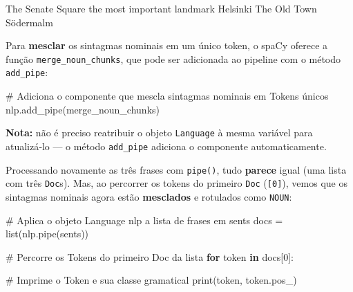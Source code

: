 \documentclass[
  brazilian,
  11pt,
]{article}
\newenvironment{Shaded}{\begin{snugshade}}{\end{snugshade}}
\newcommand{\BuiltInTok}[1]{\textcolor[rgb]{0.50,0.55,0.55}{#1}}
\newcommand{\CommentTok}[1]{\textcolor[rgb]{0.48,0.49,0.49}{#1}}
\newcommand{\ControlFlowTok}[1]{\textcolor[rgb]{0.99,0.74,0.29}{\textbf{#1}}}
\newcommand{\DecValTok}[1]{\textcolor[rgb]{0.96,0.45,0.00}{#1}}
\newcommand{\KeywordTok}[1]{\textcolor[rgb]{0.81,0.81,0.76}{\textbf{#1}}}
\newcommand{\NormalTok}[1]{\textcolor[rgb]{0.81,0.81,0.76}{#1}}
\newcommand{\OperatorTok}[1]{\textcolor[rgb]{0.81,0.81,0.76}{#1}}
\newcommand{\StringTok}[1]{\textcolor[rgb]{0.96,0.31,0.31}{#1}}
\let\oldtexttt\texttt
\renewcommand{\texttt}[1]{{\color{inlink}\oldtexttt{#1}}}
\begin{document}
\begin{Shaded}
\begin{Highlighting}[]
\NormalTok{The Senate Square}
\NormalTok{the most important landmark}
\NormalTok{Helsinki}
\NormalTok{The Old Town}
\NormalTok{Södermalm}
\end{Highlighting}
\end{Shaded}

Para \textbf{mesclar} os sintagmas nominais em um único token, o spaCy
oferece a função \texttt{merge\_noun\_chunks}, que pode ser adicionada
ao pipeline com o método \texttt{add\_pipe}:

\begin{Shaded}
\begin{Highlighting}[]
\CommentTok{\# Adiciona o componente que mescla sintagmas nominais em Tokens únicos}
\NormalTok{nlp.add\_pipe(}\StringTok{\textquotesingle{}merge\_noun\_chunks\textquotesingle{}}\NormalTok{)}
\end{Highlighting}
\end{Shaded}

\begin{notebox}

\textbf{Nota:} não é preciso reatribuir o objeto \texttt{Language} à
mesma variável para atualizá‑lo --- o método \texttt{add\_pipe} adiciona
o componente automaticamente.

\end{notebox}

Processando novamente as três frases com \texttt{pipe()}, tudo
\textbf{parece} igual (uma lista com três \texttt{Doc}s). Mas, ao
percorrer os tokens do primeiro \texttt{Doc} (\texttt{{[}0{]}}), vemos
que os sintagmas nominais agora estão \textbf{mesclados} e rotulados
como \texttt{NOUN}:

\begin{Shaded}
\begin{Highlighting}[]
\CommentTok{\# Aplica o objeto Language \textquotesingle{}nlp\textquotesingle{} a lista de frases em \textquotesingle{}sents\textquotesingle{}}
\NormalTok{docs }\OperatorTok{=} \BuiltInTok{list}\NormalTok{(nlp.pipe(sents))}

\CommentTok{\# Percorre os Tokens do primeiro Doc da lista}
\ControlFlowTok{for}\NormalTok{ token }\KeywordTok{in}\NormalTok{ docs[}\DecValTok{0}\NormalTok{]:}

    \CommentTok{\# Imprime o Token e sua classe gramatical}
    \BuiltInTok{print}\NormalTok{(token, token.pos\_)}
\end{Highlighting}
\end{Shaded}
\end{document}
